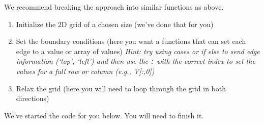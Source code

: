 We recommend breaking the approach into similar functions as above.

\begin{enumerate}
\def\labelenumi{\arabic{enumi}.}
\tightlist
\item
  Initialize the 2D grid of a chosen size (we've done that for you)
\item
  Set the boundary conditions (here you want a functions that can set
  each edge to a value or array of values) \emph{Hint: try using cases
  or if else to send edge information (`top', `left') and then use the
  \texttt{:} with the correct index to set the values for a full row or
  column (e.g., V{[}:,0{]})}
\item
  Relax the grid (here you will need to loop through the grid in both
  directions)
\end{enumerate}

We've started the code for you below. You will need to finish it.

